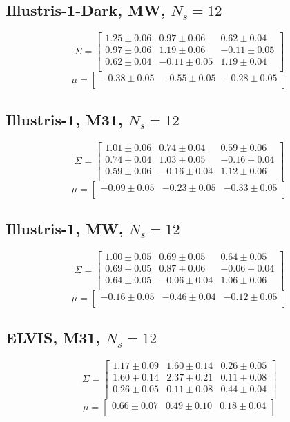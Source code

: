 \documentclass[a4paper,fleqn,usenatbib]{mnras}
\begin{document}
\subsection{Illustris-1-Dark, MW, $N_s=12$}
\[
\Sigma=
\begin{bmatrix}
1.25 \pm 0.06 & 0.97 \pm 0.06 & 0.62 \pm 0.04\\
0.97 \pm 0.06 & 1.19 \pm 0.06 & -0.11 \pm 0.05\\
0.62 \pm 0.04 & -0.11 \pm 0.05 & 1.19 \pm 0.04\\
\end{bmatrix}
\]
\[
\mu=
\begin{bmatrix}
-0.38 \pm 0.05 & -0.55 \pm 0.05 & -0.28 \pm 0.05\\
\end{bmatrix}
\]

\subsection{Illustris-1, M31, $N_s=12$}
\[
\Sigma=
\begin{bmatrix}
1.01 \pm 0.06 & 0.74 \pm 0.04 & 0.59 \pm 0.06\\
0.74 \pm 0.04 & 1.03 \pm 0.05 & -0.16 \pm 0.04\\
0.59 \pm 0.06 & -0.16 \pm 0.04 & 1.12 \pm 0.06\\
\end{bmatrix}
\]
\[
\mu=
\begin{bmatrix}
-0.09 \pm 0.05 & -0.23 \pm 0.05 & -0.33 \pm 0.05\\
\end{bmatrix}
\]
\subsection{Illustris-1, MW, $N_s=12$}
\[
\Sigma=
\begin{bmatrix}
1.00 \pm 0.05 & 0.69 \pm 0.05 & 0.64 \pm 0.05\\
0.69 \pm 0.05 & 0.87 \pm 0.06 & -0.06 \pm 0.04\\
0.64 \pm 0.05 & -0.06 \pm 0.04 & 1.06 \pm 0.06\\
\end{bmatrix}
\]
\[
\mu=
\begin{bmatrix}
-0.16 \pm 0.05 & -0.46 \pm 0.04 & -0.12 \pm 0.05\\
\end{bmatrix}
\]

\subsection{ELVIS, M31, $N_s=12$}
\[
\Sigma=
\begin{bmatrix}
1.17 \pm 0.09 & 1.60 \pm 0.14 & 0.26 \pm 0.05\\
1.60 \pm 0.14 & 2.37 \pm 0.21 & 0.11 \pm 0.08\\
0.26 \pm 0.05 & 0.11 \pm 0.08 & 0.44 \pm 0.04\\
\end{bmatrix}
\]
\[
\mu=
\begin{bmatrix}
0.66 \pm 0.07 & 0.49 \pm 0.10 & 0.18 \pm 0.04\\
\end{bmatrix}
\]
\end{document}
